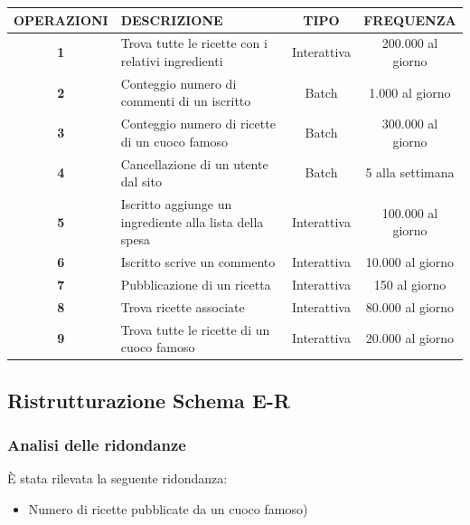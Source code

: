 \documentclass[12pt]{extarticle}
\begin{document}
\vspace{1cm}
    \begin{tabularx}{\textwidth}{c|X|c|c}
    \bfseries OPERAZIONI    & \bfseries DESCRIZIONE     & \bfseries TIPO & \bfseries FREQUENZA\\ 
    \hline\hline
    \bfseries 1     & Trova tutte le ricette con i relativi ingredienti         & Interattiva       &   200.000 al giorno    \\ 
    \hline
    \bfseries 2     & Conteggio numero di commenti di un iscritto               & Batch             &   1.000 al giorno \\
    \hline
    \bfseries 3     & Conteggio numero di ricette di un cuoco famoso            & Batch       &   300.000 al giorno \\
    \hline
    \bfseries 4     & Cancellazione di un utente dal sito                       & Batch           &   5 alla settimana \\
    \hline
    \bfseries 5     & Iscritto aggiunge un ingrediente alla lista della spesa   & Interattiva        &   100.000 al giorno \\
    \hline
    \bfseries 6     & Iscritto scrive un commento                               & Interattiva     &   10.000 al giorno \\
    \hline
    \bfseries 7     & Pubblicazione di un ricetta                               & Interattiva         &   150 al giorno \\
    \hline
    \bfseries 8     & Trova ricette associate                                   & Interattiva       &   80.000 al giorno\\
    \hline
    \bfseries 9     & Trova tutte le ricette di un cuoco famoso                 & Interattiva             &   20.000 al giorno\\
    \hline
    \end{tabularx}
\vspace{1cm}

\newpage

\subsection{Ristrutturazione Schema E-R}
\subsubsection{Analisi delle ridondanze}
È stata rilevata la seguente ridondanza:
\begin{itemize}
    \item Numero di ricette pubblicate da un cuoco famoso)
\end{itemize}
\end{document}
